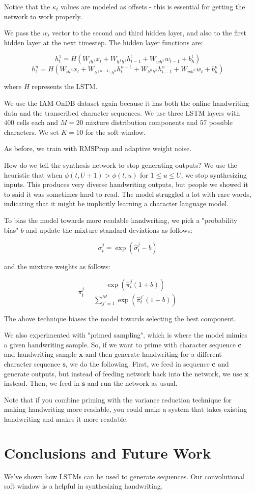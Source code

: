 \documentclass[a4paper]{article}
\begin{document}
Notice that the $\kappa_t$ values are modeled as offsets - this is essential for
getting the network to work properly.

We pass the $w_t$ vector to the second and third hidden layer, and also to
the first hidden layer at the next timestep. The hidden layer functions are:

$$
h_t^1 = H(W_{ih^1} x_t + W_{h^1 h^1} h_{t-1}^1 + W_{wh^1} w_{t-1} + b_h^1)
$$
$$
h_t^n = H(W_{ih^n} x_t + W_{h^(n-1) h^n} h_t^{n-1} + W_{h^n h^n} h_{t-1}^n
+ W_{wh^n} w_t + b_h^n)
$$

where $H$ represents the LSTM.

We use the IAM-OnDB dataset again because it has both the online handwriting
data and the transcribed character sequences. We use three LSTM layers
with 400 cells each and $M=20$ mixture distribution components and $57$
possible characters. We set $K=10$ for the soft window.

As before, we train with RMSProp and adaptive weight noise.

How do we tell the synthesis network to stop generating outputs? We use the
heuristic that when $\phi(t, U + 1) > \phi(t, u)$ for $1 \leq u \leq U$, we
stop synthesizing inputs. This produces very diverse handwriting outputs, but
people we showed it to said it was sometimes hard to read. The model struggled
a lot with rare words, indicating that it might be implicitly learning a
character language model.

To bias the model towards more readable handwriting, we pick a "probability
bias" $b$ and update the mixture standard deviations as follows:

$$
\sigma_t^j = \exp(\hat{\sigma}_t^j - b)
$$

and the mixture weights as follows:

$$
\pi_t^j = \frac{\exp(\hat{\pi}_t^j (1 + b))}{
\sum_{j' = 1}^{M}{\exp(\hat{\pi}_t^{j'}(1 + b))}
}
$$

The above technique biases the model towards selecting the best component.

We also experimented with "primed sampling", which is where the model mimics
a given handwriting sample. So, if we want to prime with character sequence
$\mathbf{c}$ and handwriting sample $\mathbf{x}$ and then generate handwriting
for a different character sequence $\mathbf{s}$, we do the following. First,
we feed in sequence $\mathbf{c}$ and generate outputs, but instead of feeding
network back into the network, we use $\mathbf{x}$ instead. Then, we feed
in $\mathbf{s}$ and run the network as usual.

Note that if you combine priming with the variance reduction technique for
making handwriting more readable, you could make a system that takes
existing handwriting and makes it more readable.

\section{Conclusions and Future Work}
We've shown how LSTMs can be used to generate sequences. Our convolutional
soft window is a helpful in synthesizing handwriting.
\end{document}
